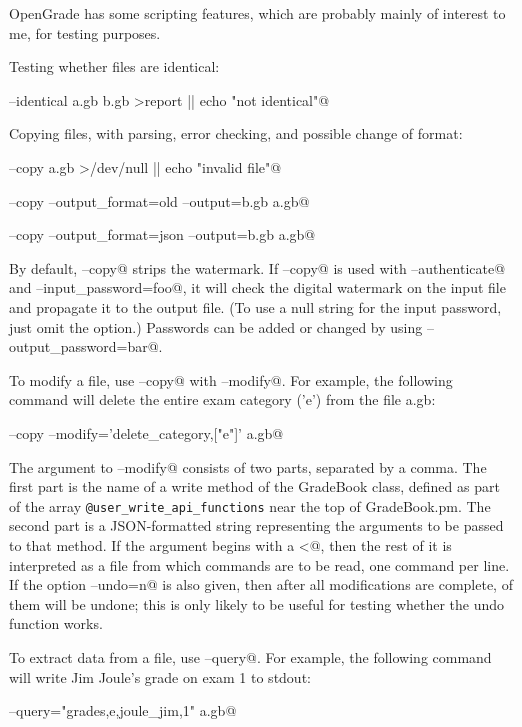 \documentclass{opengrade_doc}
\begin{document}
\label{scripting}

OpenGrade has some scripting features, which are probably mainly of interest to
me, for testing purposes.

Testing whether files are identical:

\verb@opengrade --identical a.gb b.gb >report || echo "not identical"@

Copying files, with parsing, error checking, and possible change of format:

\verb@opengrade --copy a.gb >/dev/null || echo "invalid file"@

\verb@opengrade --copy --output_format=old --output=b.gb a.gb@

\verb@opengrade --copy --output_format=json --output=b.gb a.gb@

By default, \verb@--copy@ strips the watermark.
If \verb@--copy@ is used with \verb@--authenticate@ and
\verb@--input_password=foo@, it will check the digital watermark on the input file
and propagate it to the output file.
(To use a null string for the input password, just omit the
option.)
Passwords can be added or changed by using \verb@--output_password=bar@.

To modify a file, use \verb@--copy@ with \verb@--modify@. For example,
the following command will delete the entire exam category ('e') from
the file a.gb:

\verb@opengrade --copy --modify='delete_category,["e"]' a.gb@

The argument to \verb@--modify@ consists of two parts, separated by a comma.
The first part is the name of a write method of the GradeBook class, defined
as part of the array \verb+@user_write_api_functions+ near the top of
GradeBook.pm. The second part is a JSON-formatted string representing
the arguments to be passed to that method. If the argument begins with a \verb@<@,
then the rest of it is interpreted as a file from which commands are to be read,
one command per line. If the option \verb@--undo=n@ is also given, then after
all modifications are complete, \verb@n@ of them will be undone; this is only
likely to be useful for testing whether the undo function works.

To extract data from a file, use \verb@--query@. For example, the following
command will write
Jim Joule's grade on exam 1 to stdout:

\verb@opengrade --query="grades,e,joule_jim,1" a.gb@
\end{document}
